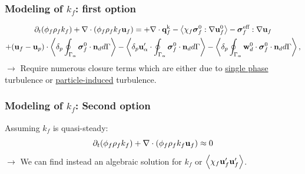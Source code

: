 \documentclass{sintefbeamer}
\begin{document}
\begin{frame}
  \frametitle{Modeling of $k_f$: first option}

\begin{multline}
  \partial_t (\phi_f\rho_fk_f)  
    + \mathbf{\nabla}\cdot (
        \phi_f\rho_fk_f\textbf{u}_f
        )
        = 
      + \mathbf{\nabla}\cdot  \textbf{q}_f^\text{k}
    - \left<\chi_f\bm{\sigma}_f^0 : \mathbf{\nabla} \textbf{u}_f^0\right>
    - \bm{\sigma}_f^\text{eff} : \mathbf{\nabla} \textbf{u}_f
    \nonumber \\
    + (\textbf{u}_f - \textbf{u}_p)\cdot \left<\delta_p \oint_{\Gamma_{\alpha}} {\bm{\sigma}_f^0 \cdot \textbf{n}_d} d\Gamma\right> 
    - \left<\delta_p  \textbf{u}_\alpha' \cdot \oint_{\Gamma_{\alpha}}   \bm{\sigma}_f^0 \cdot \textbf{n}_d d\Gamma\right>
    - \left<\delta_p  \oint_{\Gamma_{\alpha}} \textbf{w}_d^0 \cdot \bm{\sigma}_f^0 \cdot \textbf{n}_d d\Gamma\right>,
\end{multline}
\vfill
$\to$ Require numerous closure terms which are either due to \underline{single phase} turbulence or \underline{particle-induced} turbulence. 

\end{frame}
\begin{frame}
  \frametitle{Modeling of $k_f$: Second option}
Assuming $k_f$ is quasi-steady: 
\begin{equation}
  \partial_t (\phi_f\rho_fk_f)  
    + \mathbf{\nabla}\cdot (
        \phi_f\rho_fk_f\textbf{u}_f
        )
        \approx 
    0 
\end{equation}
\vfill
$\to$ We can find instead an algebraic solution for $k_f$ or $\left<\chi_f \textbf{u}_f'\textbf{u}_f'\right>$. 
\end{frame}
\end{document}
